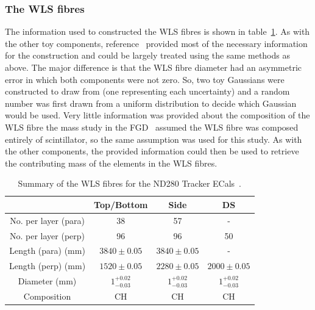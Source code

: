 \subsubsection{The WLS fibres}
\label{subsubsec:ECalMassWLSFibres}
The information used to constructed the WLS fibres is shown in table~\ref{table:WLSFibreDimensions}.  As with the other toy components, reference~\cite{1748-0221-8-10-P10019} provided most of the necessary information for the construction and could be largely treated using the same methods as above.  The major difference is that the WLS fibre diameter had an asymmetric error in which both components were not zero.  So, two toy Gaussians were constructed to draw from (one representing each uncertainty) and a random number was first drawn from a uniform distribution to decide which Gaussian would be used.  Very little information was provided about the composition of the WLS fibre the mass study in the FGD~\cite{FGDMassTN} assumed the WLS fibre was composed entirely of scintillator, so the same assumption was used for this study.  As with the other components, the provided information could then be used to retrieve the contributing mass of the elements in the WLS fibres.
\begin{table}
  \begin{tabular}{ c c c c }
     & Top/Bottom & Side & DS \\ \hline \hline
  No. per layer (para) & 38 & 57 & - \\
  No. per layer (perp) & 96 & 96 & 50 \\
  Length (para) (mm) & $3840\pm0.05$ & $3840\pm0.05$ & - \\
  Length (perp) (mm) & $1520\pm0.05$ & $2280\pm0.05$ & $2000\pm0.05$ \\
  Diameter (mm) & $1^{+0.02}_{-0.03}$ & $1^{+0.02}_{-0.03}$ & $1^{+0.02}_{-0.03}$\\
  Composition & CH & CH & CH \\

  \end{tabular}
  \caption{Summary of the WLS fibres for the ND280 Tracker ECals~\cite{1748-0221-8-10-P10019}.}
  \label{table:WLSFibreDimensions}
\end{table}


